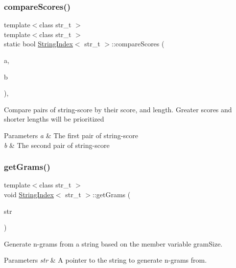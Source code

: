 \subsubsection{\texorpdfstring{compare\+Scores()}{compareScores()}}
{\footnotesize\ttfamily template$<$class str\+\_\+t $>$ \\
template$<$class str\+\_\+t $>$ \\
static bool \mbox{\hyperlink{class_string_index}{String\+Index}}$<$ str\+\_\+t $>$\+::compare\+Scores (\begin{DoxyParamCaption}\item[{std\+::pair$<$ str\+\_\+t, float $>$ \&}]{a,  }\item[{std\+::pair$<$ str\+\_\+t, float $>$ \&}]{b }\end{DoxyParamCaption})\hspace{0.3cm}{\ttfamily [inline]}, {\ttfamily [static]}}

Compare pairs of string-\/score by their score, and length. Greater scores and shorter lengths will be prioritized 
\begin{DoxyParams}{Parameters}
{\em a} & The first pair of string-\/score \\
\hline
{\em b} & The second pair of string-\/score \\
\hline
\end{DoxyParams}
\mbox{\label{class_string_index_a924cd52b4e055853db22f89e73f71fce}} 
\subsubsection{\texorpdfstring{get\+Grams()}{getGrams()}\hspace{0.1cm}{\footnotesize\ttfamily [1/2]}}
{\footnotesize\ttfamily template$<$class str\+\_\+t $>$ \\
void \mbox{\hyperlink{class_string_index}{String\+Index}}$<$ str\+\_\+t $>$\+::get\+Grams (\begin{DoxyParamCaption}\item[{str\+\_\+t $\ast$}]{str }\end{DoxyParamCaption})}

Generate n-\/grams from a string based on the member variable {\ttfamily gram\+Size}. 
\begin{DoxyParams}{Parameters}
{\em str} & A pointer to the string to generate n-\/grams from. \\
\hline
\end{DoxyParams}
\mbox{\label{class_string_index_a1b66797dae7f0f1d4f3cf830dfeee869}} 
